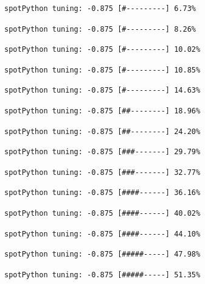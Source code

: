 \documentclass[
  letterpaper,
  DIV=11,
  numbers=noendperiod]{scrreprt}
\begin{document}
\begin{verbatim}
spotPython tuning: -0.875 [#---------] 6.73% 
\end{verbatim}

\begin{verbatim}
spotPython tuning: -0.875 [#---------] 8.26% 
\end{verbatim}

\begin{verbatim}
spotPython tuning: -0.875 [#---------] 10.02% 
\end{verbatim}

\begin{verbatim}
spotPython tuning: -0.875 [#---------] 10.85% 
\end{verbatim}

\begin{verbatim}
spotPython tuning: -0.875 [#---------] 14.63% 
\end{verbatim}

\begin{verbatim}
spotPython tuning: -0.875 [##--------] 18.96% 
\end{verbatim}

\begin{verbatim}
spotPython tuning: -0.875 [##--------] 24.20% 
\end{verbatim}

\begin{verbatim}
spotPython tuning: -0.875 [###-------] 29.79% 
\end{verbatim}

\begin{verbatim}
spotPython tuning: -0.875 [###-------] 32.77% 
\end{verbatim}

\begin{verbatim}
spotPython tuning: -0.875 [####------] 36.16% 
\end{verbatim}

\begin{verbatim}
spotPython tuning: -0.875 [####------] 40.02% 
\end{verbatim}

\begin{verbatim}
spotPython tuning: -0.875 [####------] 44.10% 
\end{verbatim}

\begin{verbatim}
spotPython tuning: -0.875 [#####-----] 47.98% 
\end{verbatim}

\begin{verbatim}
spotPython tuning: -0.875 [#####-----] 51.35% 
\end{verbatim}
\end{document}
